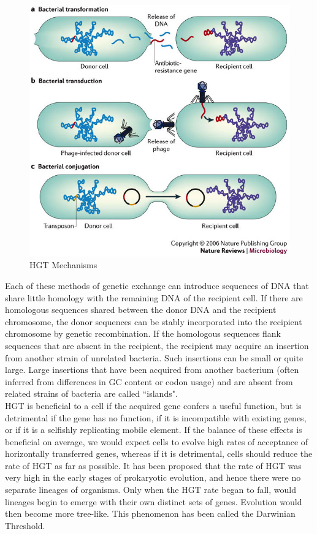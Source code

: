 \documentclass[pdftex,11pt,a4paper]{article}
\begin{document}
\begin{figure}[htg]
\centering
\includegraphics[scale=0.6]{hortran.jpg}
\caption{HGT Mechanisms}
\end{figure}
Each of these methods of genetic exchange can introduce sequences of DNA that share little homology with the remaining DNA of the recipient cell. If there are homologous sequences shared between the donor DNA and the recipient chromosome, the donor sequences can be stably incorporated into the recipient chromosome by genetic recombination. If the homologous sequences flank sequences that are absent in the recipient, the recipient may acquire an insertion from another strain of unrelated bacteria. Such insertions can be small or quite large. Large insertions that have been acquired from another bacterium (often inferred from differences in GC content or codon usage) and are absent from related strains of bacteria are called ``islands".\\

HGT is beneficial to a cell if the acquired gene confers a useful function, but is detrimental if the gene has no function, if it is incompatible with existing genes, or if it is a selfishly replicating mobile element. If the balance of these effects is beneficial on average, we would expect cells to evolve high rates of acceptance of horizontally transferred genes, whereas if it is detrimental, cells should reduce the rate of HGT as far as possible. It has been proposed that the rate of HGT was very high in the early stages of prokaryotic evolution, and hence there were no separate lineages of organisms. Only when the HGT rate began to fall, would lineages begin to emerge with their own distinct sets of genes. Evolution would then become more tree-like. This phenomenon has been called the Darwinian Threshold.
\end{document}
